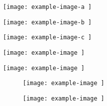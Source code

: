 \documentclass{article}
\let\vamaxheight\relax
\newlength{
		\vamaxheight
	}
\begin{document}
\begin{verticallyaligned}
	\noindent
	\begin{minipage}[b][\vamaxheight][b]{
			.30\textwidth
		}
		\centering
		\texttt{[image: 
			example-image-a
		]}
	\end{minipage}
	\hfill
	\begin{minipage}[b][\vamaxheight][t]{
			.10\textwidth
		}
		\centering
		\texttt{[image: 
			example-image-b
		]}
	\end{minipage}
	\hfill
	\begin{minipage}[b][\vamaxheight][t]{
			.20\textwidth
		}
		\centering
		\texttt{[image: 
			example-image-c
		]}
	\end{minipage}
	\hfill
	\begin{minipage}[b][\vamaxheight][c]{
			.20\textwidth
		}
		\centering
		\texttt{[image: 
			example-image
		]}
	\end{minipage}
	\hfill
	\begin{minipage}[b][\vamaxheight][t]{
			.20\textwidth
		}
		\centering
		\texttt{[image: 
			example-image
		]}
	\end{minipage}
\end{verticallyaligned}

\lipsum[1]

\begin{figure}
	\begin{verticallyaligned}
		\noindent
		\begin{minipage}[b][\vamaxheight][c]{
				.50\textwidth
			}
			\centering
			\texttt{[image: 
				example-image
			]}
			\caption{
			}
		\end{minipage}
		\hfill
		\begin{minipage}[b][\vamaxheight][t]{
				.40\textwidth
			}
			\centering
			\texttt{[image: 
				example-image
			]}
			\caption{
			}
		\end{minipage}
	\end{verticallyaligned}
	\caption{
	}
\end{figure}
\end{document}

